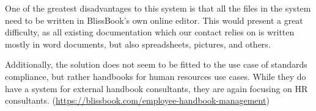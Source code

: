 One of the greatest disadvantages to this system is that all the files in the system need to be written in BlissBook's own online editor. This would present a great difficulty, as all existing documentation which our contact relies on is written mostly in word documents, but also spreadsheets, pictures, and others.

Additionally, the solution does not seem to be fitted to the use case of standards compliance, but rather handbooks for human resources use cases. While they do have a system for external handbook consultants, they are again focusing on HR consultants. (\url{https://blissbook.com/employee-handbook-management})
